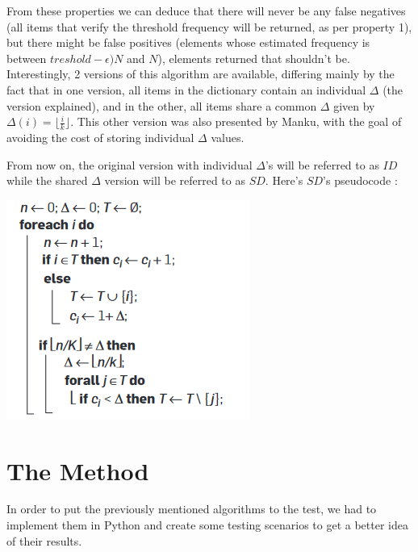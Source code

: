 \documentclass[...]{revdetua}
\begin{document}
From these properties we can deduce that there will never be any false negatives (all items that verify the threshold frequency will be returned, as per property 1), but there might be false positives (elements whose estimated frequency is between $treshold-\epsilon)N$ and $N$), elements returned that shouldn't be.\\
Interestingly, 2 versions of this algorithm are available, differing mainly by the fact that in one version, all items in the dictionary contain an individual $\Delta$ (the version explained), and in the other, all items share a common $\Delta$ given by $\Delta(i)=\lfloor{\frac{i}{k}}\rfloor$.
This other version was also presented by Manku, with the goal of avoiding the cost of storing individual $\Delta$ values.\par From now on, the original version with individual $\Delta$'s will be referred to as $ID$ while the shared $\Delta$ version will be referred to as $SD$.
Here's $SD$'s pseudocode \cite{Cormode}:

\includegraphics[scale=1]{pseudo.png}

\section{The Method}
In order to put the previously mentioned algorithms to the test, we had to implement them in Python and create some testing scenarios to get a better idea of their results.
\end{document}
